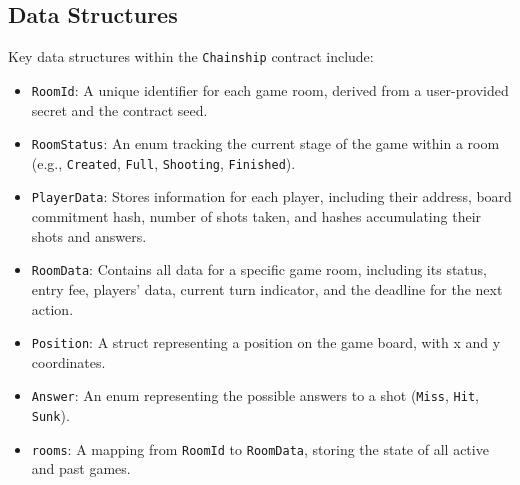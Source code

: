 \documentclass{article}
\begin{document}
    \subsection{Data Structures}
    Key data structures within the \texttt{Chainship} contract include:
    \begin{itemize}
        \item \texttt{RoomId}: A unique identifier for each game room, derived from a user-provided secret and the contract seed.
        \item \texttt{RoomStatus}: An enum tracking the current stage of the game within a room (e.g., \texttt{Created}, \texttt{Full}, \texttt{Shooting}, \texttt{Finished}).
        \item \texttt{PlayerData}: Stores information for each player, including their address, board commitment hash, number of shots taken, and hashes accumulating their shots and answers.
        \item \texttt{RoomData}: Contains all data for a specific game room, including its status, entry fee, players' data, current turn indicator, and the deadline for the next action.
        \item \texttt{Position}: A struct representing a position on the game board, with x and y coordinates.
        \item \texttt{Answer}: An enum representing the possible answers to a shot (\texttt{Miss}, \texttt{Hit}, \texttt{Sunk}).
        \item \texttt{rooms}: A mapping from \texttt{RoomId} to \texttt{RoomData}, storing the state of all active and past games.
    \end{itemize}
\end{document}
